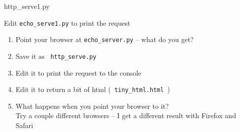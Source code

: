 \documentclass{beamer}
\begin{document}
\begin{frame}[fragile]{http\_serve1.py}

{\Large Edit \verb|echo_serve1.py| to print the request}
\begin{enumerate}
  \item Point your browser at \verb|echo_server.py| -- what do you get?
  \item Save it as \verb| http_serve.py |
  \item Edit it to print the request to the console
  \item Edit it to return a bit of html (\verb| tiny_html.html |)
  \item What happens when you point your browser to it? \\
        Try a couple different browsers -- I get a different result with Firefox and Safari
\end{enumerate}

\end{frame}
\end{document}

